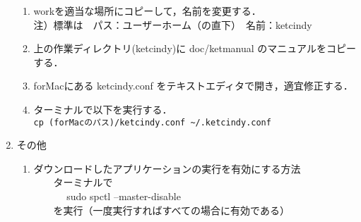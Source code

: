 \documentclass{ujarticle}
\begin{document}
\begin{enumerate}[\bf\large 1.]
\begin{enumerate}[(1)]
  \item workを適当な場所にコピーして，名前を変更する．\\
\hspace*{2zw}注）標準は　パス：ユーザーホーム（の直下）　名前：ketcindy
  \item 上の作業ディレクトリ(ketcindy)に doc/ketmanual のマニュアルをコピーする．
  \item forMacにある ketcindy.conf をテキストエディタで開き，適宜修正する．
  \item ターミナルで以下を実行する．\\
  \hspace*{1zw}\verb|cp (forMacのパス)/ketcindy.conf ~/.ketcindy.conf|
  \end{enumerate}

\item その他
\begin{enumerate}[(1)]
\item ダウンロードしたアプリケーションの実行を有効にする方法\\
　　ターミナルで\\
　　　    sudo spctl --master-disable\\
　　を実行（一度実行すればすべての場合に有効である）
 \end{enumerate}

\end{enumerate}
\end{document}
